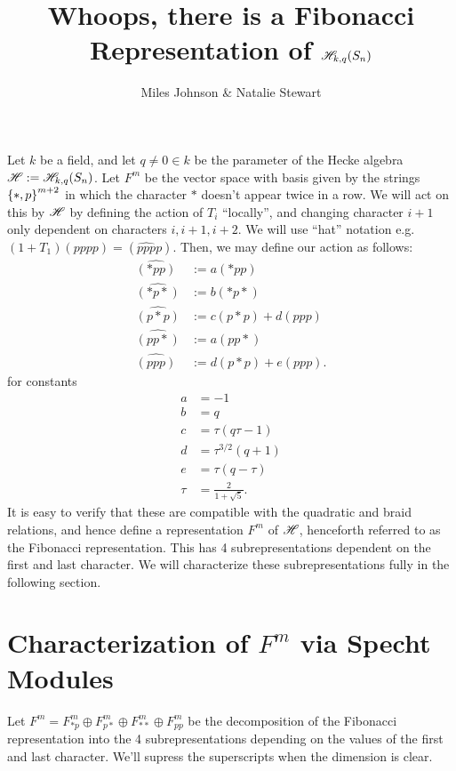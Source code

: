 \documentclass{amsart}
\begin{document}
\title{Whoops, there is a Fibonacci Representation of $\mathscr{H}_{k,q}(S_{n})$}
\author{Miles Johnson \& Natalie Stewart}
\maketitle


Let $k$ be a field, and let $q \neq 0 \in k$ be the parameter of the Hecke algebra $\mathscr{H} := \mathscr{H}_{k,q}(S_n)$.
Let $F^m$ be the vector space with basis given by the strings $\left\{ *,p \right\}^{m+2}$ in which the character $*$ doesn't appear twice in a row.
We will act on this by $\mathscr{H}$ by defining the action of $T_i$ ``locally'', and changing character $i+1$ only dependent on characters $i,i+1,i+2$.
We will use ``hat'' notation e.g. $(1 + T_1)(pppp) = (\widehat{ppp}p)$.
Then, we may define our action as follows:
\begin{align*}
  \widehat{(*pp)} &:= a(*pp)\\
  \widehat{(*p*)} &:= b(*p*)\\
  \widehat{(p*p)} &:= c(p*p) + d(ppp)\\
  \widehat{(pp*)} &:= a(pp*)\\
  \widehat{(ppp)} &:= d(p*p) + e(ppp).
\end{align*}
for constants
\begin{align*}
  a &= -1\\
  b &= q\\
  c &= \tau(q\tau - 1)\\
  d &= \tau^{3/2}(q + 1)\\
  e &= \tau(q-\tau)\\
  \tau &= \frac{2}{1 + \sqrt 5}.
\end{align*}
It is easy to verify that these are compatible with the quadratic and braid relations, and hence define a representation $F^m$ of $\mathscr{H}$, henceforth referred to as the Fibonacci representation.
This has 4 subrepresentations dependent on the first and last character.
We will characterize these subrepresentations fully in the following section.

\section{Characterization of $F^m$ via Specht Modules}
Let $F^{m} = F^{m}_{*p} \oplus F^{m}_{p*} \oplus F^m_{**} \oplus F^m_{pp}$ be the decomposition of the Fibonacci representation into the 4 subrepresentations depending on the values of the first and last character.
We'll supress the superscripts when the dimension is clear.
\end{document}
